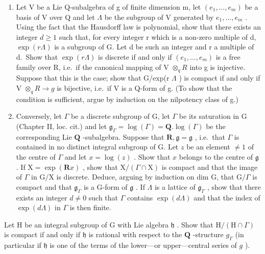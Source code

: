 \begin{enumerate}
\def\labelenumi{(\alph{enumi})}
\setcounter{enumi}{1}
\item
  Let V be a Lie Q-subalgebra of g of finite dimension m, let \((e_{1},\ldots,e_{m})\) be a basis of V over Q and let \(\Lambda\) be the subgroup of V generated by \(e_{1},\ldots,e_{m}\) . Using the fact that the Hausdorff law is polynomial, show that there exists an integer \(d\geqslant1\) such that, for every integer r which is a non-zero multiple of d, \(\exp(r\Lambda)\) is a subgroup of G. Let d be such an integer and r a multiple of d.~Show that \(\exp(r\Lambda)\) is discrete if and only if \((e_{1},\ldots,e_{m})\) is a free family over R, i.e.~if the canonical mapping of V \(\otimes_{q}R\) into g is injective. Suppose that this is the case; show that G/exp(r \(\Lambda\) ) is compact if and only if V \(\otimes_{q}R\to g\) is bijective, i.e.~if V is a Q-form of g. (To show that the condition is sufficient, argue by induction on the nilpotency class of g.)
\item
  Conversely, let \(\Gamma\) be a discrete subgroup of G, let \(\Gamma\) be its saturation in G (Chapter II, loc. cit.) and let \(\mathfrak{g}_{\Gamma} = \log (\Gamma) = \mathbf{Q}. \log (\Gamma)\) be the corresponding Lie \(\mathbf{Q}\) -subalgebra. Suppose that \(\mathbf{R}, \mathfrak{g} = \mathfrak{g}\) , i.e.~that \(\Gamma\) is contained in no distinct integral subgroup of G. Let \(z\) be an element \(\neq 1\) of the centre of \(\Gamma\) and let \(x = \log (z)\) . Show that \(x\) belongs to the centre of \(\mathfrak{g}\) . If \(\mathrm{X} = \exp (\mathbf{R}x)\) , show that \(\mathrm{X} / (\Gamma \cap \mathrm{X})\) is compact and that the image of \(\Gamma\) in \(\mathrm{G} / \mathrm{X}\) is discrete. Deduce, arguing by induction on dim G, that \(\mathrm{G} / \Gamma\) is compact and that \(\mathfrak{g}_{\Gamma}\) is a G-form of \(\mathfrak{g}\) . If \(\Lambda\) is a lattice of \(\mathfrak{g}_{\Gamma}\) , show that there exists an integer \(d \neq 0\) such that \(\Gamma\) contains \(\exp (d\Lambda)\) and that the index of \(\exp (d\Lambda)\) in \(\Gamma\) is then finite.
\end{enumerate}

Let H be an integral subgroup of G with Lie algebra \(\mathfrak{h}\) . Show that \(\mathrm{H} / (\mathrm{H} \cap \Gamma)\) is compact if and only if \(\mathfrak{h}\) is rational with respect to the \(\mathbf{Q}\) -structure \(g_{\Gamma}\) (in particular if \(\mathfrak{h}\) is one of the terms of the lower---or upper---central series of \(g\) ).


